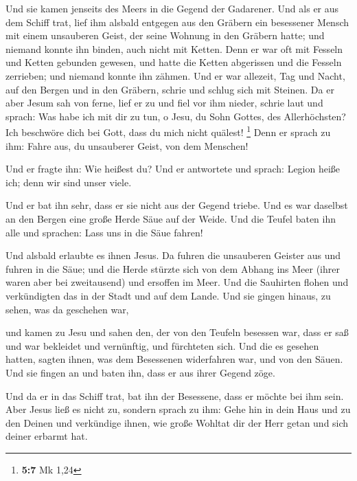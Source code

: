  Und sie kamen jenseits des Meers in die Gegend der
Gadarener.  Und als er aus dem Schiff trat, lief ihm
alsbald entgegen aus den Gräbern ein besessener Mensch mit einem
unsauberen Geist,  der seine Wohnung in den Gräbern hatte;
und niemand konnte ihn binden, auch nicht mit Ketten. 
Denn er war oft mit Fesseln und Ketten gebunden gewesen, und hatte die
Ketten abgerissen und die Fesseln zerrieben; und niemand konnte ihn
zähmen.  Und er war allezeit, Tag und Nacht, auf den
Bergen und in den Gräbern, schrie und schlug sich mit Steinen.
 Da er aber Jesum sah von ferne, lief er zu und fiel vor
ihm nieder, schrie laut und sprach:  Was habe ich mit dir
zu tun, o Jesu, du Sohn Gottes, des Allerhöchsten? Ich beschwöre dich
bei Gott, dass du mich nicht quälest! \footnote{\textbf{5:7} Mk 1,24}
 Denn er sprach zu ihm: Fahre aus, du unsauberer Geist,
von dem Menschen!

 Und er fragte ihn: Wie heißest du? Und er antwortete und
sprach: Legion heiße ich; denn wir sind unser viele.

 Und er bat ihn sehr, dass er sie nicht aus der Gegend
triebe.  Und es war daselbst an den Bergen eine große
Herde Säue auf der Weide.  Und die Teufel baten ihn alle
und sprachen: Lass uns in die Säue fahren!

 Und alsbald erlaubte es ihnen Jesus. Da fuhren die
unsauberen Geister aus und fuhren in die Säue; und die Herde stürzte
sich von dem Abhang ins Meer (ihrer waren aber bei zweitausend) und
ersoffen im Meer.  Und die Sauhirten flohen und
verkündigten das in der Stadt und auf dem Lande. Und sie gingen hinaus,
zu sehen, was da geschehen war,

 und kamen zu Jesu und sahen den, der von den Teufeln
besessen war, dass er saß und war bekleidet und vernünftig, und
fürchteten sich.  Und die es gesehen hatten, sagten
ihnen, was dem Besessenen widerfahren war, und von den Säuen.
 Und sie fingen an und baten ihn, dass er aus ihrer
Gegend zöge.

 Und da er in das Schiff trat, bat ihn der Besessene,
dass er möchte bei ihm sein.  Aber Jesus ließ es nicht
zu, sondern sprach zu ihm: Gehe hin in dein Haus und zu den Deinen und
verkündige ihnen, wie große Wohltat dir der Herr getan und sich deiner
erbarmt hat.

